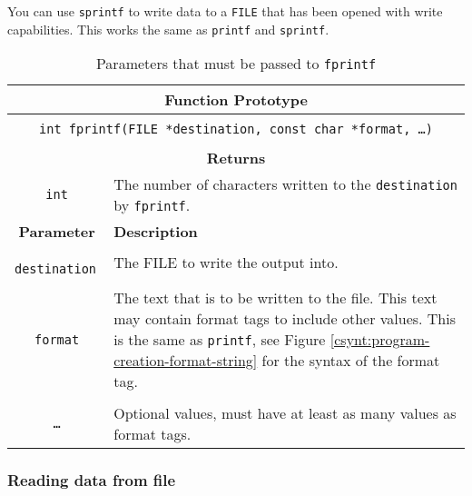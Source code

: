 You can use \texttt{sprintf} to write data to a \texttt{FILE} that has been opened with write capabilities. This works the same as \texttt{printf} and \texttt{sprintf}.

\begin{table}[h]
  \centering
  \begin{tabular}{|c|p{9cm}|}
    \hline
    \multicolumn{2}{|c|}{\textbf{Function Prototype}} \\
    \hline
    \multicolumn{2}{|c|}{} \\
    \multicolumn{2}{|c|}{\texttt{int fprintf(FILE *destination, const char *format, \ldots )}} \\
    \multicolumn{2}{|c|}{} \\
    \hline
    \multicolumn{2}{|c|}{\textbf{Returns}} \\
    \hline
    \texttt{int} & The number of characters written to the \texttt{destination} by \texttt{fprintf}. \\
    \hline
    \textbf{Parameter} & \textbf{Description} \\
    \hline
    \texttt{ destination } & The FILE to write the output into.\\
    & \\
    \texttt{ format } & The text that is to be written to the file. This text may contain format tags to include other values. This is the same as \texttt{printf}, see Figure \ref{csynt:program-creation-format-string} for the syntax of the format tag. \\
    & \\
    \texttt{\ldots}   & Optional values, must have at least as many values as format tags. \\
    \hline
  \end{tabular}
  \caption{Parameters that must be passed to \texttt{fprintf}}
  \label{tbl:fprintf}
\end{table}



\clearpage

\subsubsection{Reading data from file} %
\label{ssub:reading_data_from_file}

